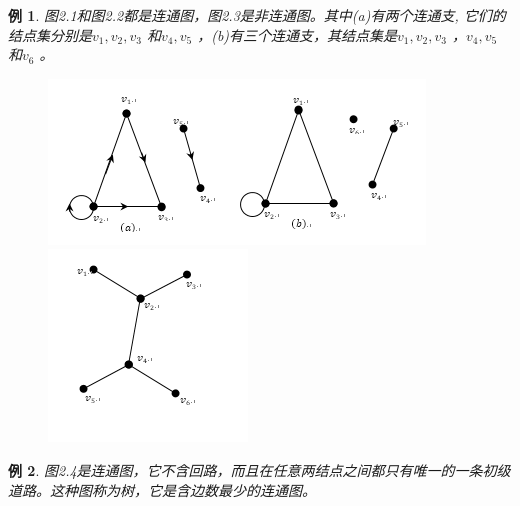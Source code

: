 \documentclass[a4paper,11pt]{book}
\newtheorem{sample}{\textbf{例}}[section]
\begin{document}
\begin{sample}
图2.1和图2.2都是连通图，图2.3是非连通图。其中(a)有两个连通支, 它们的结点集分别是{$v_1,v_2,v_3$ }和{$v_4,v_5$ }，(b)有三个连通支，其结点集是{$v_1,v_2,v_3$ }，{$v_4,v_5$ } 和{$v_6$ }。
\end{sample}
\begin{figure}
  \centering
  \begin{minipage}[!ht]{.5\linewidth}
  \includegraphics[width=1.0\linewidth]{2.3.png}
  \caption{}
  \end{minipage}
  \begin{minipage}[!ht]{.35\linewidth}
   \includegraphics[width=1.0\linewidth]{2.4.png}
  \caption{}
  \end{minipage}
\end{figure}
\begin{sample}
图2.4是连通图，它不含回路，而且在任意两结点之间都只有唯一的一条初级道路。这种图称为树，它是含边数最少的连通图。
\end{sample}
\end{document}
